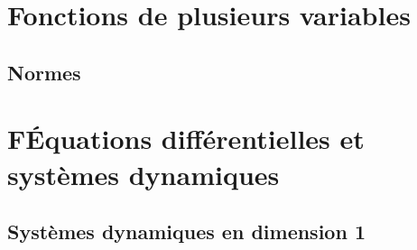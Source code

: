 \documentclass[french, 12pt]{article}
\numberwithin{exercise}{section}
\numberwithin{equation}{section}
\begin{document}


\section{Fonctions de plusieurs variables} 
\newcommand{\multivar}{/home/robin/ENSEIGN/Cours/MathBiologie/L3-ENS-Math1/Exercices/MultiVar}

\subsection{Normes}





\section{F\'Equations différentielles et systèmes dynamiques} 
\newcommand{\equadiff}{/home/robin/ENSEIGN/Cours/MathBiologie/L3-ENS-Math1/Exercices/EquaDiff}

\subsection{Systèmes dynamiques en dimension 1}


\end{document}
